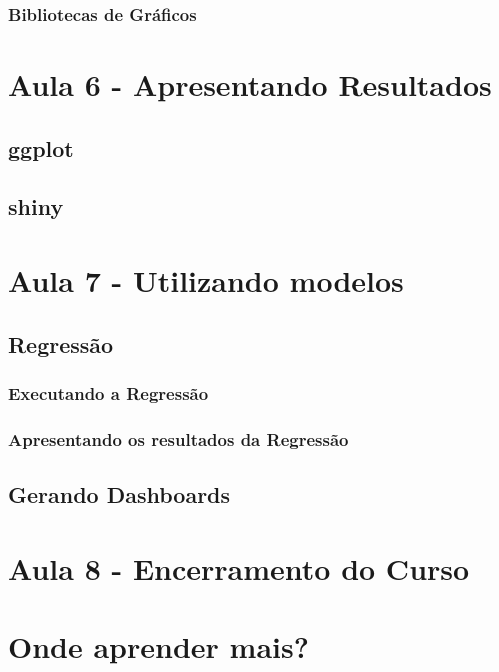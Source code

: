 \documentclass[12pt,a4paper,oneside]{erdc}\usepackage[]{graphicx}\usepackage[]{color}
\begin{document}
		\subsection{Bibliotecas de Gráficos}


\chapter{Aula 6 - Apresentando Resultados}

	\section{ggplot}

	\section{shiny}



\chapter{Aula 7 - Utilizando modelos}

	\section{Regressão}
	
		\subsection{Executando a Regressão}
		
		\subsection{Apresentando os resultados da Regressão}
	
	\section{Gerando Dashboards}




\chapter{Aula 8 - Encerramento do Curso}




\chapter{Onde aprender mais?}



%








\end{document}
